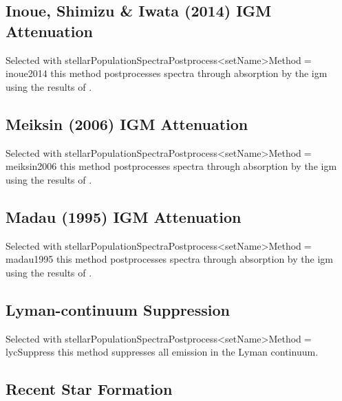 \subsection{Inoue, Shimizu \& Iwata (2014) IGM Attenuation}\label{phys:spectraPostprocessor:spectraPostprocessorInoue2014}

Selected with {\normalfont \ttfamily stellarPopulationSpectraPostprocess\textless setName\textgreater Method}$=${\normalfont \ttfamily inoue2014} this method postprocesses spectra through absorption by the \gls{igm} using the results of \cite{inoue_updated_2014}.

\subsection{Meiksin (2006) IGM Attenuation}\label{phys:spectraPostprocessor:spectraPostprocessorMeiksin2006}

Selected with {\normalfont \ttfamily stellarPopulationSpectraPostprocess\textless setName\textgreater Method}$=${\normalfont \ttfamily meiksin2006} this method postprocesses spectra through absorption by the \gls{igm} using the results of \cite{meiksin_colour_2006}.

\subsection{Madau (1995) IGM Attenuation}\label{phys:spectraPostprocessor:spectraPostprocessorMadau1995}

Selected with {\normalfont \ttfamily stellarPopulationSpectraPostprocess\textless setName\textgreater Method}$=${\normalfont \ttfamily madau1995} this method postprocesses spectra through absorption by the \gls{igm} using the results of \cite{madau_radiative_1995}.

\subsection{Lyman-continuum Suppression}\label{phys:spectraPostprocessor:spectraPostprocessorLycSuppress}

Selected with {\normalfont \ttfamily stellarPopulationSpectraPostprocess\textless setName\textgreater Method}$=${\normalfont \ttfamily lycSuppress} this method suppresses all emission in the Lyman continuum.

\subsection{Recent Star Formation}\label{phys:spectraPostprocessor:spectraPostprocessorRecent}

